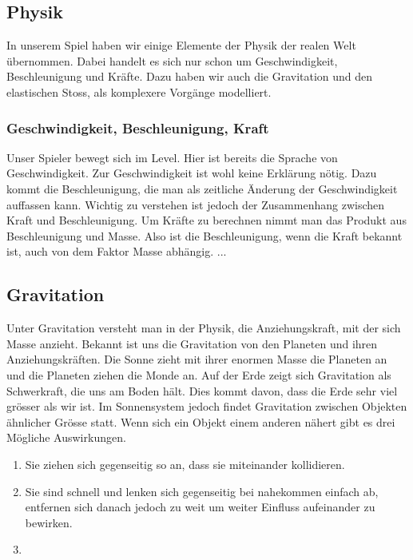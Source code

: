 \documentclass[12pt,a4paper]{scrartcl}
\begin{document}
\subsection{Physik}
In unserem Spiel haben wir einige Elemente der Physik der realen Welt übernommen.
Dabei handelt es sich nur schon um Geschwindigkeit, Beschleunigung und Kräfte.
Dazu haben wir auch die Gravitation und den elastischen Stoss, als komplexere Vorgänge modelliert.
\subsubsection{Geschwindigkeit, Beschleunigung, Kraft}
Unser Spieler bewegt sich im Level.
Hier ist bereits die Sprache von Geschwindigkeit.
Zur Geschwindigkeit ist wohl keine Erklärung nötig.
Dazu kommt die Beschleunigung, die man als zeitliche Änderung der Geschwindigkeit auffassen kann.
Wichtig zu verstehen ist jedoch der Zusammenhang zwischen Kraft und Beschleunigung.
Um Kräfte zu berechnen nimmt man das Produkt aus Beschleunigung und Masse.
Also ist die Beschleunigung, wenn die Kraft bekannt ist, auch von dem Faktor Masse abhängig. ...

\subsection{Gravitation}
Unter Gravitation versteht man in der Physik, die Anziehungskraft, mit der sich Masse anzieht.
Bekannt ist uns die Gravitation von den Planeten und ihren Anziehungskräften.
Die Sonne zieht mit ihrer enormen Masse die Planeten an und die Planeten ziehen die Monde an.
Auf der Erde zeigt sich Gravitation als Schwerkraft, die uns am Boden hält.
Dies kommt davon, dass die Erde sehr viel grösser als wir ist.
Im Sonnensystem jedoch findet Gravitation zwischen Objekten ähnlicher Grösse statt.
Wenn sich ein Objekt einem anderen nähert gibt es drei Mögliche Auswirkungen.
\begin{enumerate}
\item Sie ziehen sich gegenseitig so an, dass sie miteinander kollidieren.
\item Sie sind schnell und lenken sich gegenseitig bei nahekommen einfach ab, entfernen sich danach jedoch zu weit um weiter Einfluss aufeinander zu bewirken.
\item 

\end{enumerate}
\end{document}

